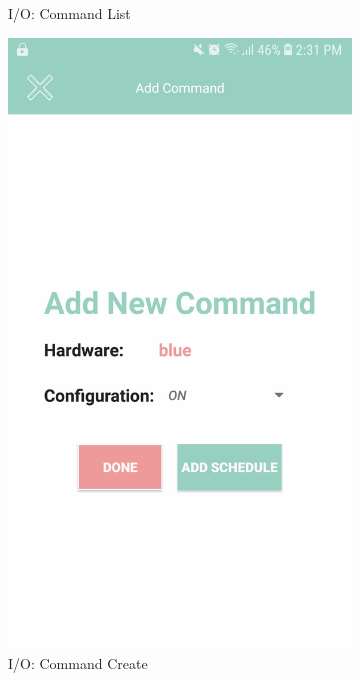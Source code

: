 \documentclass[12pt, oneside, a4paper]{book}
\begin{document}
\begin{figure}[H]
\begin{subfigure}[b]{.35\linewidth}
				\caption{I/O: Command List}
			\end{subfigure}
			\begin{subfigure}[b]{.35\linewidth}
				\includegraphics[width=\linewidth]{img/output_command_new.jpg}
				\caption{I/O: Command Create}
			\end{subfigure}
			\begin{subfigure}[b]{.35\linewidth}

\end{subfigure}
\end{figure}
\end{document}
